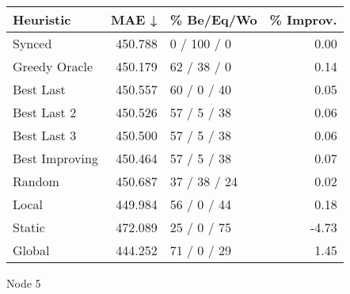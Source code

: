 \begin{tabular}{lrlr}
\toprule
\textbf{Heuristic} & \textbf{MAE ↓} & \textbf{\% Be/Eq/Wo} & \textbf{\% Improv.} \\
\midrule
            Synced &        450.788 &          0 / 100 / 0 &                0.00 \\
     Greedy Oracle &        450.179 &          62 / 38 / 0 &                0.14 \\
         Best Last &        450.557 &          60 / 0 / 40 &                0.05 \\
       Best Last 2 &        450.526 &          57 / 5 / 38 &                0.06 \\
       Best Last 3 &        450.500 &          57 / 5 / 38 &                0.06 \\
    Best Improving &        450.464 &          57 / 5 / 38 &                0.07 \\
            Random &        450.687 &         37 / 38 / 24 &                0.02 \\
             Local &        449.984 &          56 / 0 / 44 &                0.18 \\
            Static &        472.089 &          25 / 0 / 75 &               -4.73 \\
            Global &        444.252 &          71 / 0 / 29 &                1.45 \\
\bottomrule
\end{tabular}
\caption{Node 5}
\label{tab:iid_lr01_le1_bs4_5}
